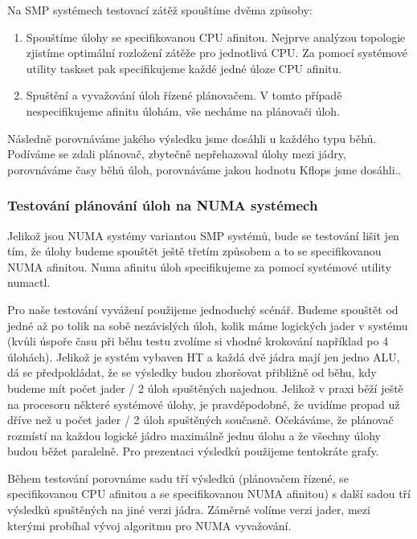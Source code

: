 \documentclass[
  master=true,
  font=sans,
  printversion=false,
  joinlists=true,
  figures=true,
  tables=true,
  sourcecodes=false,
  theorems=false,
  bibencoding=utf8,
  language=czech,
  encoding=utf8,
  field=ainfk,
  biblatex,
  glossaries,
  index
]{kidiplom}
\begin{document}
\noindent
Na SMP systémech testovací zátěž spouštíme dvěma způsoby:
\begin{enumerate}
\item Spouštíme úlohy se specifikovanou CPU afinitou. Nejprve analýzou topologie zjistíme optimální rozložení zátěže pro jednotlivá CPU. Za pomocí systémové utility taskset pak specifikujeme každé jedné úloze CPU afinitu.  
\item Spuštění a vyvažování úloh řízené plánovačem. V tomto případě nespecifikujeme afinitu úlohám, vše necháme na plánovači úloh.
\end{enumerate}

Následně porovnáváme jakého výsledku jsme dosáhli u každého typu běhů. Podíváme se zdali plánovač, zbytečně nepřehazoval úlohy mezi jádry, porovnáváme časy běhů úloh, porovnáváme jakou hodnotu Kflops jsme dosáhli..

\subsubsection{Testování plánování úloh na NUMA systémech}

Jelikož jsou NUMA systémy variantou SMP systémů, bude se testování lišit jen tím, že úlohy budeme spouštět ještě třetím způsobem a to se specifikovanou NUMA afinitou. Numa afinitu úloh specifikujeme za pomocí systémové utility numactl.

Pro naše testování vyvážení použijeme jednoduchý scénář. Budeme spouštět od jedné až po tolik na sobě nezávislých úloh, kolik máme logických jader v systému (kvůli úspoře času při běhu testu zvolíme si vhodné krokování například po 4 úlohách). Jelikož je systém vybaven HT a každá dvě jádra mají jen jedno ALU, dá se předpokládat, že se výsledky budou zhoršovat přibližně od běhu, kdy budeme mít počet jader / 2 úloh spuštěných najednou. Jelikož v praxi běží ještě na procesoru některé systémové úlohy, je pravděpodobné, že uvidíme propad už dříve než u počet jader / 2 úloh spuštěných současně. Očekáváme, že plánovač rozmístí na každou logické jádro maximálně jednu úlohu a že všechny úlohy budou běžet paralelně. Pro prezentaci výsledků použijeme tentokráte grafy.

Během testování porovnáme sadu tří výsledků (plánovačem řízené, se specifikovanou CPU afinitou a se specifikovanou NUMA afinitou) s další sadou tří výsledků spuštěných na jiné verzi jádra. Záměrně volíme verzi jader, mezi kterými probíhal vývoj algoritmu pro NUMA vyvažování.
\end{document}
